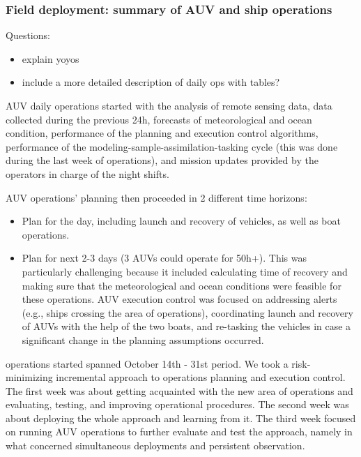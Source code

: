 \subsubsection{Field deployment: summary of AUV and ship operations}

Questions:
\begin{itemize}
    \item explain yoyos
    \item include a more detailed description of daily ops with tables?
\end{itemize}


AUV daily operations started with the analysis of remote sensing data,
data collected during the previous 24h, forecasts of meteorological and
ocean condition, performance of the planning and execution control
algorithms, performance of the modeling-sample-assimilation-tasking
cycle (this was done during the last week of operations), and mission
updates provided by the operators in charge of the night shifts.

AUV operations’ planning then proceeded in 2 different time horizons:

\begin{itemize}

\item Plan for the day, including launch and recovery of
  vehicles, as well as boat operations. 

\item Plan for next 2-3 days (3 AUVs could operate for 50h+). This was
  particularly challenging
  because it included calculating time of recovery and making sure that
  the meteorological and ocean conditions were feasible for these
  operations. AUV execution control was focused on addressing alerts
  (e.g., ships crossing the area of operations), coordinating launch and
  recovery of AUVs with the help of the two boats, and re-tasking the
  vehicles in case a significant change in the planning assumptions
  occurred. 

\end{itemize}

\proj operations started spanned October 14th - 31st period. We took a
risk-minimizing incremental approach to operations planning and
execution control. The first week was about getting acquainted with the
new area of operations and evaluating, testing, and improving
operational procedures. The second week was about deploying the whole
approach and learning from it. The third week focused on running AUV
operations to further evaluate and test the approach, namely in what
concerned simultaneous deployments and persistent observation.

